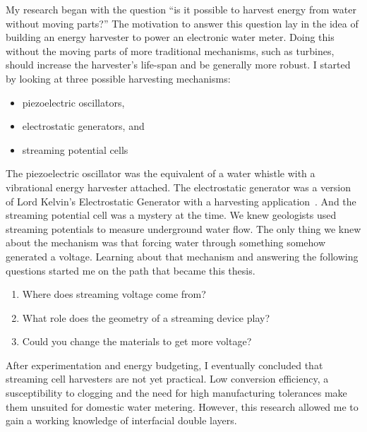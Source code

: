   My research began with the question ``is it possible to harvest energy from water without moving parts?''
  The motivation to answer this question lay in the idea of building an energy harvester to power an electronic water meter.
  Doing this without the moving parts of more traditional mechanisms, such as turbines, should increase the harvester's life-span and be generally more robust.
  I started by looking at three possible harvesting mechanisms:
  \begin{itemize}
    \item piezoelectric oscillators,
    \item electrostatic generators, and
    \item streaming potential cells
  \end{itemize}
  The piezoelectric oscillator was the equivalent of a water whistle with a vibrational energy harvester attached.
  The electrostatic generator was a version of Lord Kelvin's Electrostatic Generator with a harvesting application~\cite{Thomson1867a}.
  And the streaming potential cell was a mystery at the time.
  We knew geologists used streaming potentials to measure underground water flow.
  The only thing we knew about the mechanism was that forcing water through something somehow generated a voltage.
  Learning about that mechanism and answering the following questions started me on the path that became this thesis.
  \begin{enumerate}
    \item Where does streaming voltage come from?
    \item What role does the geometry of a streaming device play?
    \item Could you change the materials to get more voltage?
  \end{enumerate}
  After experimentation and energy budgeting, I eventually concluded that streaming cell harvesters are not yet practical.
  Low conversion efficiency, a susceptibility to clogging and the need for high manufacturing tolerances make them unsuited for domestic water metering.
  However, this research allowed me to gain  a working knowledge of interfacial double layers.

